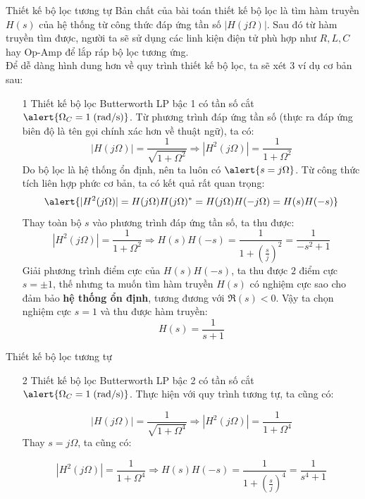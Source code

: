 \documentclass[8pt]{beamer}
\begin{document}
\begin{frame}{Thiết kế bộ lọc tương tự}
	Bản chất của bài toán thiết kế bộ lọc là tìm \alert{hàm truyền $H(s)$} của hệ thống từ công thức đáp ứng tần số $|H(j\Omega)|$. Sau đó từ hàm truyền tìm được, người ta sẽ sử dụng các linh kiện điện tử phù hợp như $R,L,C$ hay Op-Amp để lắp ráp bộ lọc tương ứng.
\\ Để dễ dàng hình dung hơn về quy trình thiết kế bộ lọc, ta sẽ xét 3 ví dụ cơ bản sau:
\begin{enumerate}
	\item[1] Thiết kế bộ lọc Butterworth LP bậc 1 có tần số cắt $\alert{\Omega_{C}=1\;\text{(rad/s)}}$.
Từ phương trình đáp ứng tần số (thực ra đáp ứng biên độ là tên gọi chính xác hơn về thuật ngữ), ta có:
$$|H(j\Omega)|=\frac{1}{\sqrt{1+\Omega^2}}\Rightarrow |H^2(j\Omega)|=\frac{1}{1+\Omega^2}$$
Do bộ lọc là hệ thống ổn định, nên ta luôn có $\alert{s=j\Omega}$. Từ công thức tích liên hợp phức cơ bản, ta có kết quả rất quan trọng: $$\alert{|H^2(j\Omega)|=H(j\Omega)H(j\Omega)^*=H(j\Omega)H(-j\Omega)=H(s)H(-s)}$$
Thay toàn bộ $s$ vào phương trình đáp ứng tần số, ta thu được:
$$|H^2(j\Omega)|=\frac{1}{1+\Omega^2}\Rightarrow H(s)H(-s)=\frac{1}{1+\left(\frac{s}{j}\right)^2}=\frac{1}{-s^2+1}$$
Giải phương trình điểm cực của $H(s)H(-s)$, ta thu được $2$ điểm cực $s=\pm 1$, thế nhưng ta muốn tìm \alert{hàm truyền $H(s)$} có nghiệm cực sao cho đảm bảo \textbf{hệ thống ổn định}, tương đương với $\Re{(s)}<0$. Vậy ta chọn nghiệm cực $s=1$ và thu được hàm truyền: $$H(s)=\frac{1}{s+1}$$
	\end{enumerate}

\end{frame}
\begin{frame}{Thiết kế bộ lọc tương tự}
	\begin{enumerate}
		\item[2] Thiết kế bộ lọc Butterworth LP bậc 2 có tần số cắt $\alert{\Omega_{C}=1\;\text{(rad/s)}}$.  Thực hiện với quy trình tương tự, ta cũng có:

$$|H(j\Omega)|=\frac{1}{\sqrt{1+\Omega^4}}\Rightarrow |H^2(j\Omega)|=\frac{1}{1+\Omega^4}$$
Thay $s=j\Omega$, ta cũng có:

$$|H^2(j\Omega)|=\frac{1}{1+\Omega^4}\Rightarrow H(s)H(-s)=\frac{1}{1+\left(\frac{s}{j}\right)^4}=\frac{1}{s^4+1}$$
	\end{enumerate}
\end{frame}
\end{document}
